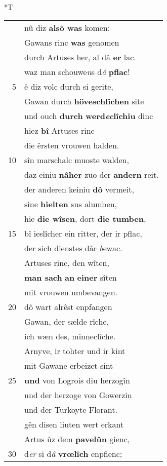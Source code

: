 \documentclass[8pt,a4paper,notitlepage]{article}
\begin{document}
\begin{table}[ht]
\begin{minipage}[t]{0.5\linewidth}
\begin{center}*T
\end{center}
\begin{tabular}{rl}
 & nû diz \textbf{alsô was} komen:\\ 
 & Gawans rinc \textbf{was} genomen\\ 
 & durch Artuses her, al dâ \textbf{er} lac.\\ 
 & waz man schouwe\textit{n}s d\textit{â} \textbf{pflac}!\\ 
5 & ê diz volc durch si gerite,\\ 
 & Gawan durch \textbf{höveschlîchen} site\\ 
 & und ouch \textbf{durch} \textbf{werd\textit{ec}lîchiu} dinc\\ 
 & hiez \textbf{bî} Artuses rinc\\ 
 & die êrsten vrouwen halden.\\ 
10 & sîn marschalc muoste walden,\\ 
 & daz einiu \textbf{nâher} zuo der \textbf{andern} reit.\\ 
 & der anderen keiniu \textbf{dô} vermeit,\\ 
 & sine \textbf{hielten} sus alumben,\\ 
 & hie \textbf{die wîsen}, dort \textbf{die tumben},\\ 
15 & bî ieslîcher ein ritter, der ir pflac,\\ 
 & der sich dienstes dâr \textit{b}ewac.\\ 
 & Artuses rinc, den wîten,\\ 
 & \textbf{man sach} \textbf{an} \textbf{einer} sîten\\ 
 & mit vrouwen umbevangen.\\ 
20 & dô wart alrêst enpfangen\\ 
 & Gawan, der sælde rîche,\\ 
 & ich wæn des, minneclîche.\\ 
 & Arnyve, ir tohter und ir kint\\ 
 & mit Gawane erbeizet sint\\ 
25 & \textbf{und} von Logrois diu herzogîn\\ 
 & und der herzoge von Gowerzin\\ 
 & und der Turkoyte Florant.\\ 
 & gên disen liuten wert erkant\\ 
 & Artus ûz dem \textbf{pavelûn} gienc,\\ 
30 & d\textit{er} si d\textit{â} \textbf{vrœlîch} enpfienc;\\ 

\end{tabular}
\end{minipage}
\end{table}
\end{document}
